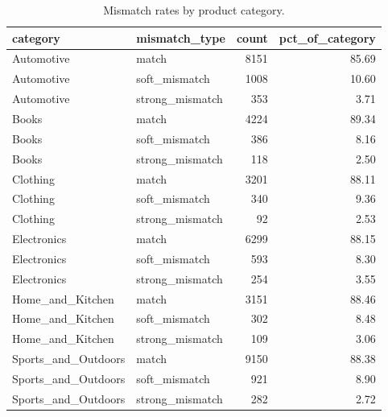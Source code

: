 \begin{table}
\caption{Mismatch rates by product category.}
\label{tab:mismatch_by_category}
\begin{tabular}{llrr}
\toprule
category & mismatch_type & count & pct_of_category \\
\midrule
Automotive & match & 8151 & 85.69 \\
Automotive & soft_mismatch & 1008 & 10.60 \\
Automotive & strong_mismatch & 353 & 3.71 \\
Books & match & 4224 & 89.34 \\
Books & soft_mismatch & 386 & 8.16 \\
Books & strong_mismatch & 118 & 2.50 \\
Clothing & match & 3201 & 88.11 \\
Clothing & soft_mismatch & 340 & 9.36 \\
Clothing & strong_mismatch & 92 & 2.53 \\
Electronics & match & 6299 & 88.15 \\
Electronics & soft_mismatch & 593 & 8.30 \\
Electronics & strong_mismatch & 254 & 3.55 \\
Home_and_Kitchen & match & 3151 & 88.46 \\
Home_and_Kitchen & soft_mismatch & 302 & 8.48 \\
Home_and_Kitchen & strong_mismatch & 109 & 3.06 \\
Sports_and_Outdoors & match & 9150 & 88.38 \\
Sports_and_Outdoors & soft_mismatch & 921 & 8.90 \\
Sports_and_Outdoors & strong_mismatch & 282 & 2.72 \\
\bottomrule
\end{tabular}
\end{table}
